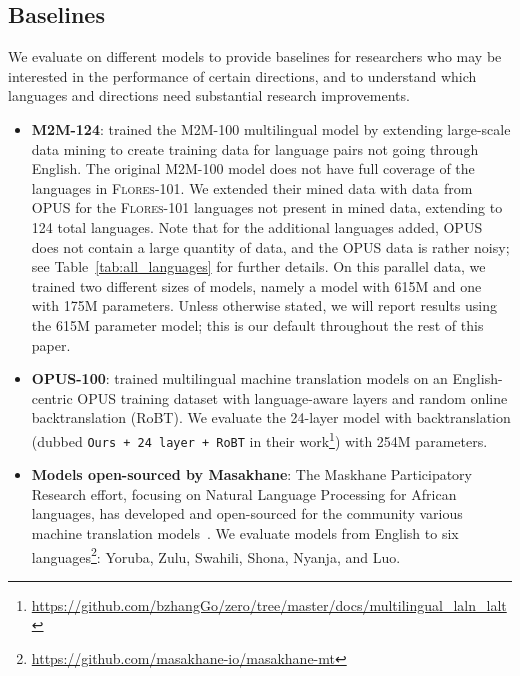 \subsection{Baselines} 

We evaluate on different models to provide baselines for researchers who may be interested in the performance of certain directions, and to understand which languages and directions need substantial research improvements.

\begin{itemize}
\itemsep0em \item \textbf{M2M-124}: \citet{fan2020beyond} trained the M2M-100 multilingual model by  extending large-scale data mining to create training data for language pairs not going through English. The original M2M-100 model does not have full coverage of the languages in \textsc{Flores-101}.
  We extended their mined data with data from OPUS for the \textsc{Flores-101} languages not present in mined data,  extending to 124 total languages. Note that for the additional languages added, OPUS does not contain a large quantity of data, and the OPUS data is rather noisy; see Table~\ref{tab:all_languages} for further details. On this parallel data, we trained two different sizes of models, namely a model with 615M and one with 175M parameters. Unless otherwise stated, we will report results using the 615M parameter model; this is our default throughout the rest of this paper.  
    \item \textbf{OPUS-100}: \citet{zhang-etal-2020-improving} trained multilingual machine translation models on an English-centric OPUS training dataset with language-aware layers and random online backtranslation (RoBT). We evaluate the 24-layer model with backtranslation (dubbed \texttt{Ours + 24 layer + RoBT} in their work\footnote{\url{https://github.com/bzhangGo/zero/tree/master/docs/multilingual_laln_lalt}}) with 254M parameters. 
    \item \textbf{Models open-sourced by Masakhane}: The Maskhane Participatory Research effort, focusing on Natural Language Processing for African languages, has developed and open-sourced for the community various machine translation models~\cite{nekoto2020participatory,abbott2019benchmarking,abbott-martinus-2019-benchmarking}. We evaluate models from English to six languages\footnote{\url{https://github.com/masakhane-io/masakhane-mt}}: Yoruba, Zulu, Swahili, Shona, Nyanja, and Luo. 

\end{itemize}

